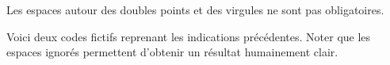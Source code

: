\documentclass[10pt, a4paper]{article}
\begin{document}


\begin{tdocnote}
    Les espaces autour des doubles points et des virgules ne sont pas obligatoires.
\end{tdocnote}




Voici deux codes fictifs reprenant les indications précédentes. Noter que les espaces ignorés permettent d'obtenir un résultat humainement clair.
\begin{multicols}{2}	
	
\end{multicols}
\end{document}

